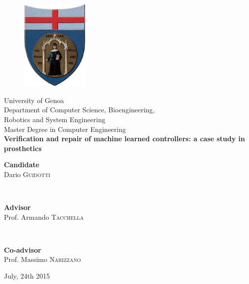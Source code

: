 \begin{titlepage}
%
\begin{center}
\begin{figure}[htbp]
\centering
\includegraphics[width=0.3\textwidth]{Images/unige2.jpg}
\end{figure}
%
{\LARGE University of Genoa\\}
%
%
{\Large {Department of Computer Science, Bioengineering,\\ Robotics and System Engineering}\\}
%
\vspace{0.7cm}
%
{\LARGE {Master Degree in Computer Engineering}\\}
%
\vspace{0.8cm}
%
%
%
{\Huge \textbf{Verification and repair of machine learned controllers: a case study in prosthetics}\\}
%
%
\vspace{1.0cm}
%
\end{center}
%
\begin{minipage}{\textwidth}
\begin{flushright}
{\Large{ \bfseries Candidate}\\[0.1cm]
Dario \textsc{Guidotti}}
\end{flushright}
\end{minipage}
\\[1cm]
%
\begin{minipage}{0.5\textwidth}
\begin{flushleft}
{\Large
{\bfseries Advisor}\\[0.1cm]
Prof. Armando \textsc{Tacchella}}
\end{flushleft}
\end{minipage}
\\[0.4cm]
\begin{minipage}{0.5\textwidth}
\begin{flushleft}
{\Large
{\bfseries Co-advisor}\\[0.1cm]
Prof. Massimo \textsc{Narizzano}}
\end{flushleft}
\end{minipage}
%
\vfill
\begin{center}
{\Large July, 24th 2015}
\end{center}
\end{titlepage}